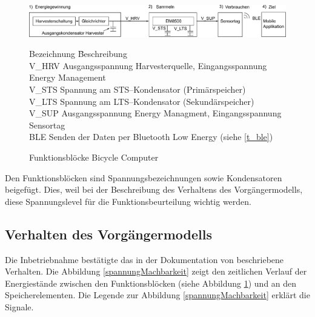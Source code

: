 \begin{figure}[ht]
       \includegraphics[width=1\textwidth]{3Vorgehen/imag/Blockdiagramm.png}
       \caption{Funktionsblöcke Bicycle Computer}
       \label{funktionsdiagramm_bild}

    \begin{tabbing}
        Bezeichnung \quad\= Beschreibung\\[0.8ex]
        V\_HRV \> Ausgangsspannung Harvesterquelle, Eingangsspannung Energy Management\\
        V\_STS\> Spannung am STS--Kondensator (Primärspeicher)\\
        V\_LTS\> Spannung am LTS--Kondensator (Sekundärspeicher)\\
        V\_SUP\> Ausgangsspannung Energy Managment, Eingangsspannung Sensortag\\
        BLE \> Senden der Daten per Bluetooth Low Energy (siehe \ref{t_ble}) \\
    \end{tabbing} 
\end{figure}

Den Funktionsblöcken sind Spannungsbezeichnungen sowie Kondensatoren beigefügt. Dies, weil bei der Beschreibung des Verhaltens des Vorgängermodells, diese Spannungslevel für die Funktionsbeurteilung wichtig werden.

  

\subsection{Verhalten des Vorgängermodells}\label{verhalten} 

Die Inbetriebnahme bestätigte das in der Dokumentation von \cite{PA_bicycle} beschriebene Verhalten. Die Abbildung \ref{spannungMachbarkeit} zeigt den zeitlichen Verlauf der Energiestände zwischen den Funktionsblöcken (siehe Abbildung \ref{funktionsdiagramm_bild}) und an den Speicherelementen. Die Legende zur Abbildung  \ref{spannungMachbarkeit} erklärt die Signale.

